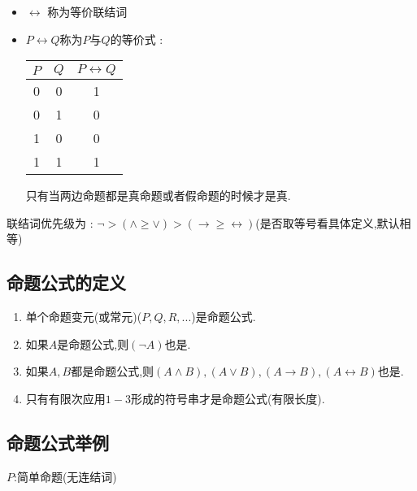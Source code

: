 {{{\begin{itemize}
{            只考虑形式逻辑不考虑内在联系,因此有局限性,有时候会得到一些奇怪且显然错误的结论.

            可以把它当成$\leq$(?)
            }
      \item $\leftrightarrow$ 称为等价联结词
      \item {
            $P \leftrightarrow Q$称为$P$与$Q$的等价式 :

            \begin{center}
              \begin{tabular}{c|c|c}
                \hline
                $P$ & $Q$ & $P \leftrightarrow Q$ \\
                \hline
                0   & 0   & 1                     \\
                0   & 1   & 0                     \\
                1   & 0   & 0                     \\
                1   & 1   & 1                     \\
                \hline
              \end{tabular}
            \end{center}

            只有当两边命题都是真命题或者假命题的时候才是真.
            }
    \end{itemize}

    联结词优先级为 : $\lnot > (\land \geq \lor) > (\to \geq \leftrightarrow)$(是否取等号看具体定义,默认相等)
   }%

  \subsection{命题公式的定义}{
    \begin{enumerate}
      \item 单个命题变元(或常元)($P,Q,R,...$)是命题公式.
      \item 如果$A$是命题公式,则$(\lnot A)$也是.
      \item 如果$A,B$都是命题公式,则$(A \land B),(A \lor B),(A \to B),(A \leftrightarrow B)$也是.
      \item 只有有限次应用$1 - 3$形成的符号串才是命题公式(有限长度).
    \end{enumerate}
  }%

  \subsection{命题公式举例}{
    $P$:简单命题(无连结词)

}}}
